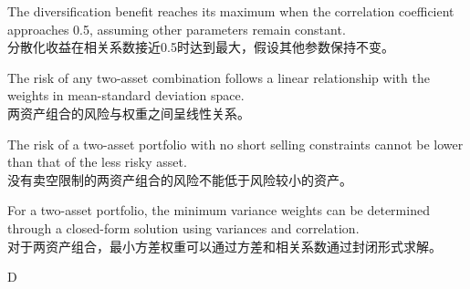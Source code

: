 \documentclass{article}
\begin{document}
\begin{choices}
    \item The diversification benefit reaches its maximum when the correlation coefficient approaches 0.5, assuming other parameters remain constant.\\
    分散化收益在相关系数接近0.5时达到最大，假设其他参数保持不变。
    
    \item The risk of any two-asset combination follows a linear relationship with the weights in mean-standard deviation space.\\
    两资产组合的风险与权重之间呈线性关系。
    
    \item The risk of a two-asset portfolio with no short selling constraints cannot be lower than that of the less risky asset.\\
    没有卖空限制的两资产组合的风险不能低于风险较小的资产。
    
    \item For a two-asset portfolio, the minimum variance weights can be determined through a closed-form solution using variances and correlation.\\
    对于两资产组合，最小方差权重可以通过方差和相关系数通过封闭形式求解。
\end{choices}

\begin{correctanswer}
    D
\end{correctanswer}
\end{document}
